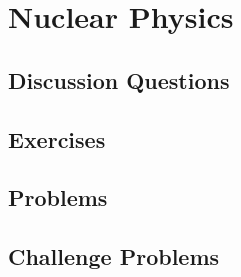 
\chapter{Nuclear Physics}

\section{Discussion Questions}

\section{Exercises}

\section{Problems}

\section{Challenge Problems}
